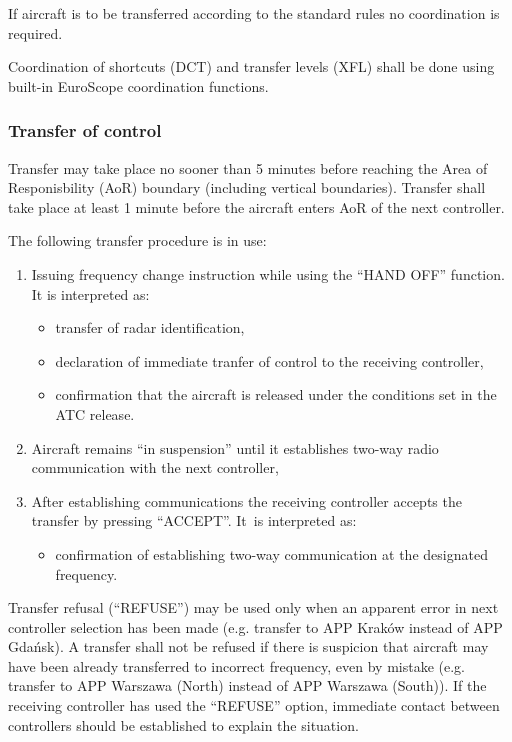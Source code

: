 If aircraft is to be transferred according to the standard rules no coordination
is required.

Coordination of shortcuts (DCT) and transfer levels (XFL) shall be done using
built-in EuroScope coordination functions.

\subsubsection{Transfer of control}

Transfer may take place no sooner than 5 minutes before reaching the Area of
Responisbility (AoR) boundary (including vertical boundaries). Transfer shall
take place at least 1 minute before the aircraft enters AoR of the next
controller.

The following transfer procedure is in use:

\begin{enumerate}
\item Issuing frequency change instruction while using the ``HAND OFF''
  function. It is interpreted as:
  \begin{itemize}
  \item transfer of radar identification,
  \item declaration of immediate tranfer of control to the receiving controller,
  \item confirmation that the aircraft is released under the conditions set in
    the ATC release.
  \end{itemize}
\item Aircraft remains ``in suspension'' until it establishes two-way radio
  communication with the next controller,
\item After establishing communications the receiving controller accepts the
  transfer by pressing ``ACCEPT''. It~is interpreted as:
  \begin{itemize}
  \item confirmation of establishing two-way communication at the designated frequency.
  \end{itemize}
\end{enumerate}

Transfer refusal (``REFUSE'') may be used only when an apparent error in next
controller selection has been made (e.g. transfer to APP Kraków instead of APP
Gdańsk). A transfer shall not be refused if there is suspicion that aircraft may
have been already transferred to incorrect frequency, even by mistake (e.g.
transfer to APP Warszawa (North) instead of APP Warszawa (South)). If the
receiving controller has used the ``REFUSE'' option, immediate contact between
controllers should be established to explain the situation.

